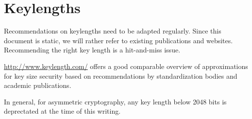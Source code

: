 \section{Keylengths}

Recommendations on keylengths need to be adapted regularly. Since this document is static, we will rather refer to 
existing publications and websites.  Recommending the right key length is a hit-and-miss issue.

\url{http://www.keylength.com/} offers a good comparable overview of approximations for key size security based on recommendations by standardization bodies and academic publications.

In general, for asymmetric cryptography, any key length below 2048 bits is deprectated at the time of this writing.





